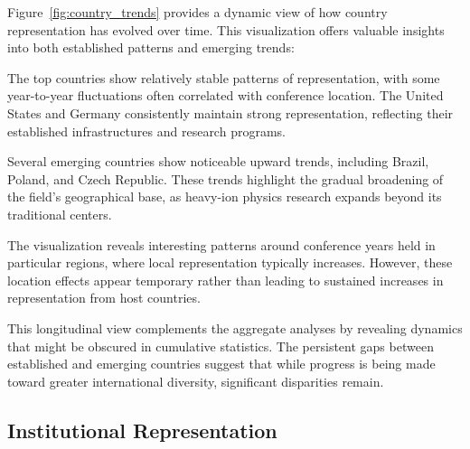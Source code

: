 \documentclass[a4paper,11pt]{article}
\begin{document}
Figure~\ref{fig:country_trends} provides a dynamic view of how country representation has evolved over time. This visualization offers valuable insights into both established patterns and emerging trends:

The top countries show relatively stable patterns of representation, with some year-to-year fluctuations often correlated with conference location. The United States and Germany consistently maintain strong representation, reflecting their established infrastructures and research programs.

Several emerging countries show noticeable upward trends, including Brazil, Poland, and Czech Republic. These trends highlight the gradual broadening of the field's geographical base, as heavy-ion physics research expands beyond its traditional centers.

The visualization reveals interesting patterns around conference years held in particular regions, where local representation typically increases. However, these location effects appear temporary rather than leading to sustained increases in representation from host countries.

This longitudinal view complements the aggregate analyses by revealing dynamics that might be obscured in cumulative statistics. The persistent gaps between established and emerging countries suggest that while progress is being made toward greater international diversity, significant disparities remain.

\subsection{Institutional Representation}
\end{document}
